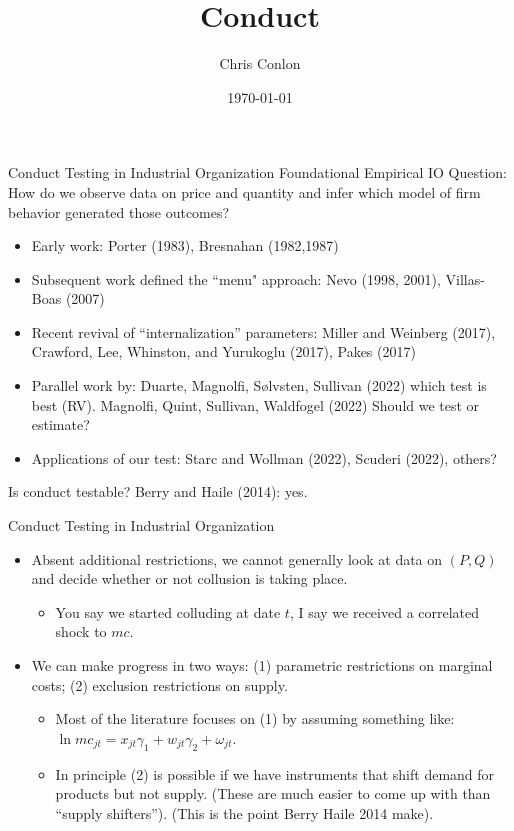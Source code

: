 \documentclass[aspectratio=169,10pt]{beamer}
\begin{document}
\title{Conduct}
\author{Chris Conlon}
\date{\today}

\frame{\titlepage}


\begin{frame}[plain]{Conduct Testing in Industrial Organization}
Foundational Empirical IO Question: How do we observe data on price and quantity and infer which model of firm behavior generated those outcomes?

\begin{itemize}
\item Early work: Porter (1983), Bresnahan (1982,1987)
\item Subsequent work defined the ``menu" approach: Nevo (1998, 2001), Villas-Boas (2007) 
\item Recent revival of ``internalization'' parameters: Miller and Weinberg (2017), Crawford, Lee, Whinston, and Yurukoglu (2017), Pakes (2017)
\item Parallel work by: Duarte, Magnolfi, Sølvsten, Sullivan (2022) which test is best (RV). Magnolfi, Quint, Sullivan, Waldfogel (2022) Should we test or estimate?
\item Applications of our test: Starc and Wollman (2022), Scuderi (2022), others?
\end{itemize}
Is conduct testable? Berry and Haile (2014): yes.
\end{frame}


\begin{frame}{Conduct Testing in Industrial Organization}
\begin{itemize}
\item Absent additional restrictions, we cannot generally look at data on $(P,Q)$ and decide whether or not collusion is taking place.
\begin{itemize}
\item You say we started colluding at date $t$, I say we received a correlated shock to $mc$.
\end{itemize}
\item We can make progress in two ways: (1) parametric restrictions on marginal costs; (2) exclusion restrictions on supply.
\begin{itemize}
\item Most of the literature focuses on (1) by assuming something like: $\ln mc_{jt} = x_{jt} \gamma_1 + w_{jt} \gamma_2 + \omega_{jt}$.
\item In principle (2) is possible if we have instruments that shift demand for products but not supply. (These are much easier to come up with than ``supply shifters''). (This is the point Berry Haile 2014 make).
\end{itemize}
\end{itemize}
\end{frame}
\end{document}
